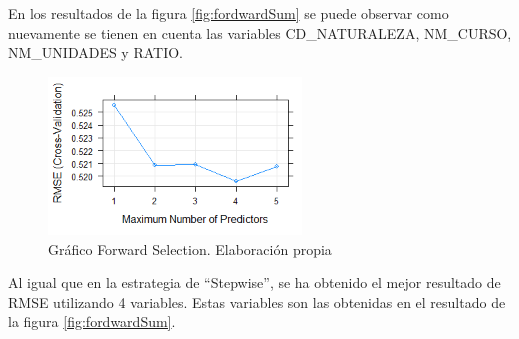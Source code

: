 \begin{subappendices}
En los resultados de la figura \ref{fig:fordwardSum} se puede observar como nuevamente se tienen en cuenta las variables CD\_NATURALEZA, NM\_CURSO, NM\_UNIDADES y RATIO.

\begin{figure}[htb]
	\centering
	\caption{Gráfico Forward Selection. Elaboración propia}
	\label{fig:fordward}
	\includegraphics[width=0.6\textwidth]{recursos/ImagenesR/fordward}
\end{figure}
\FloatBarrier

Al igual que en la estrategia de ``Stepwise'', se ha obtenido el mejor resultado de RMSE utilizando 4 variables. Estas variables son las obtenidas en el resultado de la figura \ref{fig:fordwardSum}.	
\end{subappendices}




